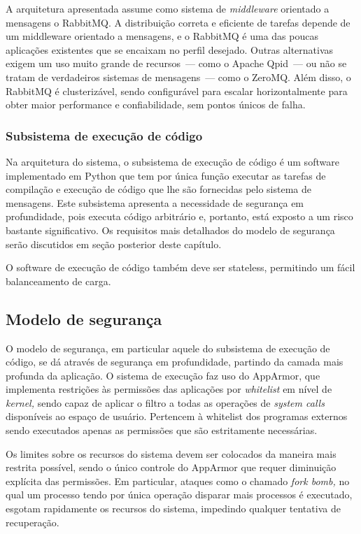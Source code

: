 \documentclass[ruledheader, 12pt]{abnt}
\begin{document}
A arquitetura apresentada assume como sistema de \emph{middleware} orientado a mensagens o RabbitMQ. A distribuição correta e eficiente de tarefas depende de um middleware orientado a mensagens, e o RabbitMQ é uma das poucas aplicações existentes que se encaixam no perfil desejado. Outras alternativas exigem um uso muito grande de recursos~--- como o Apache Qpid~--- ou não se tratam de verdadeiros sistemas de mensagens~--- como o ZeroMQ. Além disso, o RabbitMQ é clusterizável, sendo configurável para escalar horizontalmente para obter maior performance e confiabilidade, sem pontos únicos de falha.

\subsubsection{Subsistema de execução de código}

Na arquitetura do sistema, o subsistema de execução de código é um software implementado em Python que tem por única função executar as tarefas de compilação e execução de código que lhe são fornecidas pelo sistema de mensagens. Este subsistema apresenta a necessidade de segurança em profundidade, pois executa código arbitrário e, portanto, está exposto a um risco bastante significativo. Os requisitos mais detalhados do modelo de segurança serão discutidos em seção posterior deste capítulo.

O software de execução de código também deve ser stateless, permitindo um fácil balanceamento de carga.

\subsection{Modelo de segurança}

O modelo de segurança, em particular aquele do subsistema de execução de código, se dá através de segurança em profundidade, partindo da camada mais profunda da aplicação. O sistema de execução faz uso do AppArmor, que implementa restrições às permissões das aplicações por \emph{whitelist} em nível de \emph{kernel,} sendo capaz de aplicar o filtro a todas as operações de \emph{system calls} disponíveis ao espaço de usuário. Pertencem à whitelist dos programas externos sendo executados apenas as permissões que são estritamente necessárias.

Os limites sobre os recursos do sistema devem ser colocados da maneira mais restrita possível, sendo o único controle do AppArmor que requer diminuição explícita das permissões. Em particular, ataques como o chamado \emph{fork bomb,} no qual um processo tendo por única operação disparar mais processos é executado, esgotam rapidamente os recursos do sistema, impedindo qualquer tentativa de recuperação.
\end{document}
